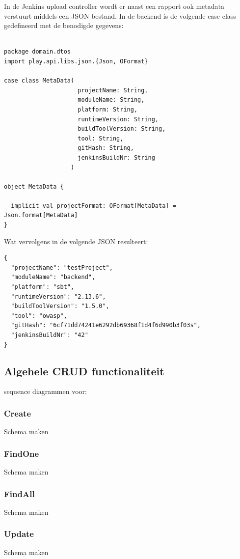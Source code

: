 In de Jenkins upload controller wordt er naast een rapport ook metadata verstuurt middels een JSON bestand. In de backend is de volgende case class gedefineerd met de benodigde gegevens:
\begin{lstlisting}[caption={case class MetaData in MetaData.scala},label=lst:metdataScala]

package domain.dtos
import play.api.libs.json.{Json, OFormat}

case class MetaData(
                     projectName: String,
                     moduleName: String,
                     platform: String,
                     runtimeVersion: String,
                     buildToolVersion: String,
                     tool: String,
                     gitHash: String,
                     jenkinsBuildNr: String
                   )

object MetaData {

  implicit val projectFormat: OFormat[MetaData] = Json.format[MetaData]
}

\end{lstlisting}
Wat vervolgens in de volgende JSON resulteert:
\begin{lstlisting}[caption={metadata JSon object behorende bij de case class}, label={lst:metadatajson}]
{
  "projectName": "testProject",
  "moduleName": "backend",
  "platform": "sbt",
  "runtimeVersion": "2.13.6",
  "buildToolVersion": "1.5.0",
  "tool": "owasp",
  "gitHash": "6cf71dd74241e6292db69368f1d4f6d990b3f03s",
  "jenkinsBuildNr": "42"
}
\end{lstlisting}

\subsection{Algehele CRUD functionaliteit}\label{subsec:algehele-crud-functionaliteit}
sequence diagrammen voor:
\subsubsection*{Create}Schema maken
\subsubsection*{FindOne}Schema maken
\subsubsection*{FindAll}Schema maken
\subsubsection*{Update}Schema maken
